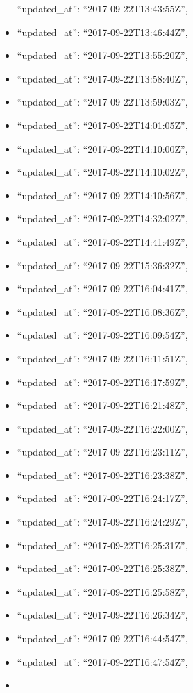 \begin{itemize}
  ``updated\_at'': ``2017-09-22T13:43:55Z'',
\item
  ``updated\_at'': ``2017-09-22T13:46:44Z'',
\item
  ``updated\_at'': ``2017-09-22T13:55:20Z'',
\item
  ``updated\_at'': ``2017-09-22T13:58:40Z'',
\item
  ``updated\_at'': ``2017-09-22T13:59:03Z'',
\item
  ``updated\_at'': ``2017-09-22T14:01:05Z'',
\item
  ``updated\_at'': ``2017-09-22T14:10:00Z'',
\item
  ``updated\_at'': ``2017-09-22T14:10:02Z'',
\item
  ``updated\_at'': ``2017-09-22T14:10:56Z'',
\item
  ``updated\_at'': ``2017-09-22T14:32:02Z'',
\item
  ``updated\_at'': ``2017-09-22T14:41:49Z'',
\item
  ``updated\_at'': ``2017-09-22T15:36:32Z'',
\item
  ``updated\_at'': ``2017-09-22T16:04:41Z'',
\item
  ``updated\_at'': ``2017-09-22T16:08:36Z'',
\item
  ``updated\_at'': ``2017-09-22T16:09:54Z'',
\item
  ``updated\_at'': ``2017-09-22T16:11:51Z'',
\item
  ``updated\_at'': ``2017-09-22T16:17:59Z'',
\item
  ``updated\_at'': ``2017-09-22T16:21:48Z'',
\item
  ``updated\_at'': ``2017-09-22T16:22:00Z'',
\item
  ``updated\_at'': ``2017-09-22T16:23:11Z'',
\item
  ``updated\_at'': ``2017-09-22T16:23:38Z'',
\item
  ``updated\_at'': ``2017-09-22T16:24:17Z'',
\item
  ``updated\_at'': ``2017-09-22T16:24:29Z'',
\item
  ``updated\_at'': ``2017-09-22T16:25:31Z'',
\item
  ``updated\_at'': ``2017-09-22T16:25:38Z'',
\item
  ``updated\_at'': ``2017-09-22T16:25:58Z'',
\item
  ``updated\_at'': ``2017-09-22T16:26:34Z'',
\item
  ``updated\_at'': ``2017-09-22T16:44:54Z'',
\item
  ``updated\_at'': ``2017-09-22T16:47:54Z'',
\item

\end{itemize}
